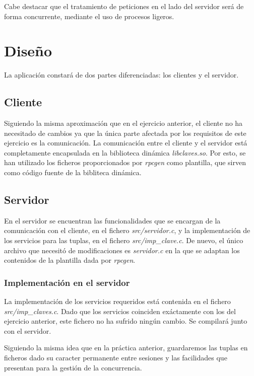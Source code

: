 \documentclass[]{article}
\begin{document}
Cabe destacar que el tratamiento de peticiones en el lado del servidor será de forma concurrente, mediante el uso de procesos ligeros. 

\section{Diseño}
\label{sec:disenno}
La aplicación constará de dos partes diferenciadas: los clientes y el servidor.

\subsection{Cliente}
\label{subsec:cliente}
Siguiendo la misma aproximación que en el ejercicio anterior, el cliente no ha necesitado de cambios ya que la única parte afectada por los requisitos de este ejercicio es la comunicación. La comunicación entre el cliente y el servidor está completamente encapsulada en la biblioteca dinámica \textit{libclaves.so}. Por esto, se han utilizado los ficheros proporcionados por \textit{rpcgen} como plantilla, que sirven como código fuente de la bibliteca dinámica.

\subsection{Servidor}
\label{subsec:servidor}
En el servidor se encuentran las funcionalidades que se encargan de la comunicación con el cliente, en el fichero \textit{src/servidor.c}, y la implementación de los servicios para las tuplas, en el fichero \textit{src/imp\_clave.c}. De nuevo, el único archivo que necesitó de modificaciones es \textit{servidor.c} en la que se adaptan los contenidos de la plantilla dada por \textit{rpcgen}. 

\subsubsection{Implementación en el servidor}
\label{subsec:implementacion_servidor}

La implementación de los servicios requeridos está contenida en el fichero \textit{src/imp\_claves.c}. Dado que los servicios coinciden exáctamente con los del ejercicio anterior, este fichero no ha sufrido ningún cambio. Se compilará junto con el servidor. 

Siguiendo la misma idea que en la práctica anterior, guardaremos las tuplas en ficheros dado su caracter permanente entre sesiones y las facilidades que presentan para la gestión de la concurrencia.
\end{document}

